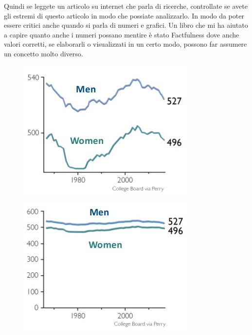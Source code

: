 \documentclass[12pt]{book} %
\begin{document}
Quindi se leggete un articolo su internet che parla di ricerche, controllate se avete gli estremi di questo articolo in
modo che possiate analizzarlo. In modo da poter essere critici anche quando si parla di numeri e grafici. Un libro che
mi ha aiutato a capire quanto anche i numeri possano mentire è stato
Factfulness dove anche
valori corretti, se elaborarli o visualizzati in un certo modo, possono far assumere un concetto molto diverso.

\needspace{4cm}
\begin{figure}[H]
    \begin{minipage}{0.3\textwidth}
        \centering
        \includegraphics[width=\linewidth]{images/Libro-img003.jpg}
    \end{minipage}
    \hfill
    \begin{minipage}{0.3\textwidth}
        \centering
        \includegraphics[width=\linewidth]{images/Libro-img005.jpg}

\end{minipage}
\end{figure}
\end{document}
